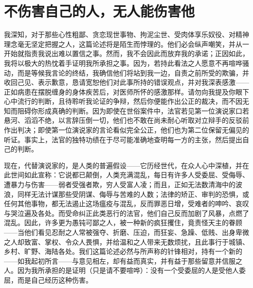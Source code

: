 
\chapter{不伤害自己的人，无人能伤害他}


我深知，对于那些心性粗鄙、贪恋现世事物、拘泥尘世、受肉体享乐奴役、对精神理念毫无坚定把握之人，这篇论述将是陌生而悖理的。他们必会纵声嘲笑，并从一开始就指责我说出难以置信之事。然而，我不会因此而放弃我的承诺；正因如此，我将以极大的热忱着手证明我所承担之事。因为，若持此看法之人愿意不再喧哗骚动，而是等候我言论的终结，我确信他们将站到我一边，自责之前所受的欺骗，并收回己见、表示歉意，恳请宽恕他们对此事所持的错误观点，并对我深表感激——正如病患在摆脱缠身的身体疾苦后，对医师所怀的感激那样。请勿向我提及你眼下心中流行的判断，且待聆听我论证的争辩，然后你便能作出公正的裁决，而不因无知而阻碍你形成真确的判断。因为即使在世俗案件中，法官若见第一位演说家口若悬河、滔滔不绝，以言辞压倒一切，他们也不敢在尚未耐心听取对立辩手的反驳前作出判决；即使第一位演说家的言论看似完全公正，他们也为第二位保留无偏见的听证。事实上，法官的独特功绩在于尽可能准确地查明每一方的主张，然后提出自己的判断。\par

现在，代替演说家的，是人类的普遍假设——它历经世代，在众人心中深植，并在此世间如此宣称：它说都已颠倒，人类充满混乱，每日有许多人受委屈、受侮辱、遭暴力与伤害——弱者受强者欺，穷人受富人凌；而且，正如无法数清海中的波浪，同样无法计谋那些受阴谋、侮辱与苦难的人数；法律的矫正、审判的恐惧，或任何其他事物，都无法遏止这场瘟疫与混乱，反而罪恶日增，受难者的呻吟、哀叹与哭泣遍及各处。而受命纠正此类恶行的法官，他们自己反而加剧了风暴，点燃了混乱。因此，许多更为愚钝可鄙之人，被一种新的疯狂攫住，竟责怪天主的眷顾——当他们看见忍耐之人常被强夺、折磨、压迫，而狂妄、急躁、低贱、出身卑微之人却致富、掌权、令众人畏惧，并给温和之人带来无数烦扰，且此事行于城镇、乡村、旷野、海陆各处。我们这篇论述必然与所声称的针锋相对，持有一个新的——如我起初所言——与意见相左，却有益而真实，并有益于那些留意并信服之人。因为我所承担的是证明（只是请不要喧哗）：没有一个受委屈的人是受他人委屈，而是自己经历这种伤害。\par

